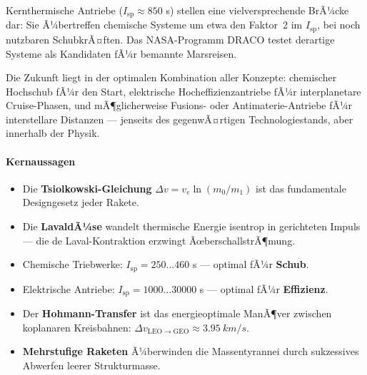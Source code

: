 ﻿\documentclass[12pt,a4paper]{article}
\newcommand{\Isp}{I_{\mathrm{sp}}}
\newcommand{\Dv}{\Delta v}
\begin{document}
Kernthermische Antriebe ($\Isp \approx 850$ s) stellen eine vielversprechende BrÃ¼cke dar:
Sie Ã¼bertreffen chemische Systeme um etwa den Faktor~2 im $\Isp$, bei noch nutzbaren
SchubkrÃ¤ften. Das NASA-Programm DRACO testet derartige Systeme als Kandidaten fÃ¼r
bemannte Marsreisen.

Die Zukunft liegt in der optimalen Kombination aller Konzepte: chemischer Hochschub
fÃ¼r den Start, elektrische Hocheffizienzantriebe fÃ¼r interplanetare Cruise-Phasen,
und mÃ¶glicherweise Fusions- oder Antimaterie-Antriebe fÃ¼r interstellare Distanzen ---
jenseits des gegenwÃ¤rtigen Technologiestands, aber innerhalb der Physik.

\bigskip
\paragraph*{Kernaussagen}
\begin{itemize}[leftmargin=*]
  \item Die \textbf{Tsiolkowski-Gleichung} $\Dv = v_e\ln(m_0/m_1)$ ist das
    fundamentale Designgesetz jeder Rakete.
  \item Die \textbf{LavaldÃ¼se} wandelt thermische Energie isentrop in gerichteten
    Impuls --- die de Laval-Kontraktion erzwingt ÃœberschallstrÃ¶mung.
  \item Chemische Triebwerke: $\Isp = 250\ldots460$ s --- optimal fÃ¼r \textbf{Schub}.
  \item Elektrische Antriebe: $\Isp = 1000\ldots30000$ s --- optimal fÃ¼r \textbf{Effizienz}.
  \item Der \textbf{Hohmann-Transfer} ist das energieoptimale ManÃ¶ver zwischen
    koplanaren Kreisbahnen: $\Dv_{\mathrm{LEO\to GEO}} \approx \SI{3.95}{km/s}$.
  \item \textbf{Mehrstufige Raketen} Ã¼berwinden die Massentyrannei durch sukzessives
    Abwerfen leerer Strukturmasse.
\end{itemize}
\end{document}
